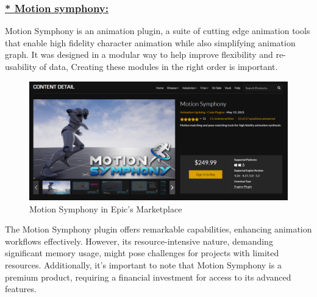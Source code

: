 \documentclass[12pt]{book}
\begin{document}
\subsubsection{\underline{* Motion symphony:}}
Motion Symphony is an animation plugin, a suite of cutting edge animation tools that enable
high fidelity character animation while also simplifying animation graph. It was designed in a modular way to help improve flexibility and re-usability of
data, Creating these modules in the right order is important.
\begin{figure}[!h]
    \centering
    \includegraphics[scale=0.3]{./Figures/Images/Motion Symphony/MotionSymphony.jpg}
    \caption{Motion Symphony in Epic’s Marketplace}
    \label{Motion Symphony in Epic’s Marketplace}
\end{figure}
The Motion Symphony plugin offers remarkable capabilities, enhancing animation workflows effectively. However, its resource-intensive nature, demanding significant memory usage, might pose challenges for projects with limited resources. Additionally, it's important to note that Motion Symphony is a premium product, requiring a financial investment for access to its advanced features.
\end{document}
